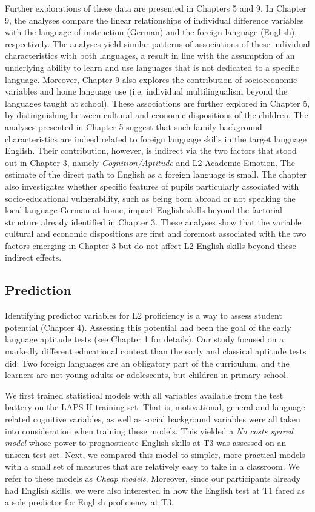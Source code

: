 \documentclass[output=paper]{langsci/langscibook}
\begin{document}
Further explorations of these data are presented in Chapters 5 and 9. In Chapter 9, the analyses compare the linear relationships of individual difference variables with the language of instruction (German) and the foreign language (English), respectively. The analyses yield similar patterns of associations of these individual characteristics with both languages, a result in line with the assumption of an underlying ability to learn and use languages that is not dedicated to a specific language. Moreover, Chapter 9 also explores the contribution of socioeconomic variables and home language use (i.e. individual multilingualism beyond the languages taught at school). These associations are further explored in Chapter 5, by distinguishing between cultural and economic dispositions of the children. The analyses presented in Chapter 5 suggest that such family background characteristics are indeed related to foreign language skills in the target language English. Their contribution, however, is indirect via the two factors that stood out in Chapter 3, namely \textit{Cognition/Aptitude} and L2 Academic Emotion. The estimate of the direct path to English as a foreign language is small. The chapter also investigates whether specific features of pupils particularly associated with socio-educational vulnerability, such as being born abroad or not speaking the local language German at home, impact English skills beyond the factorial structure already identified in Chapter 3. These analyses show that the variable cultural and economic dispositions are first and foremost associated with the two factors emerging in Chapter 3 but do not affect L2 English skills beyond these indirect effects.

\subsection{Prediction}

Identifying predictor variables for L2 proficiency is a way to assess student potential (Chapter 4). Assessing this potential had been the goal of the early language aptitude tests (see Chapter 1 for details). Our study focused on a markedly different educational context than the early and classical aptitude tests did: Two foreign languages are an obligatory part of the curriculum, and the learners are not young adults or adolescents, but children in primary school.

We first trained statistical models with all variables available from the test battery on the LAPS II training set. That is, motivational, general and language related cognitive variables, as well as social background variables were all taken into consideration when training these models. This yielded a \textit{No costs spared model} whose power to prognosticate English skills at T3 was assessed on an unseen test set. Next, we compared this model to simpler, more practical models with a small set of measures that are relatively easy to take in a classroom. We refer to these models as \textit{Cheap models}. Moreover, since our participants already had English skills, we were also interested in how the English test at T1 fared as a sole predictor for English proficiency at T3.  
\end{document}
